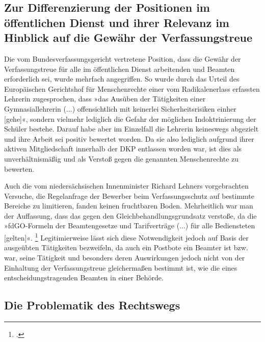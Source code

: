 \documentclass[12pt]{scrartcl}
\begin{document}
\subsection{Zur Differenzierung der Positionen im öffentlichen Dienst und ihrer Relevanz im Hinblick auf die Gewähr der Verfassungstreue}

Die vom Bundesverfassungsgericht vertretene Position, dass die Gewähr der Verfassungstreue für alle im öffentlichen Dienst arbeitenden und Beamten erforderlich sei, wurde mehrfach angegriffen. So wurde durch das Urteil des Europäischen Gerichtshof für Menschenrechte einer vom Radikalenerlass erfassten Lehrerin zugesprochen, dass »das Ausüben der Tätigkeiten einer Gymnasiallehrerin (...) offensichtlich mit keinerlei Sicherheitsrisiken einher [gehe]«, sondern vielmehr lediglich die Gefahr der möglichen Indoktrinierung der Schüler bestehe. Darauf habe aber im Einzelfall die Lehrerin keineswegs abgezielt und ihre Arbeit sei positiv bewertet worden. Da sie also lediglich aufgrund ihrer aktiven Mitgliedschaft innerhalb der DKP entlassen worden war, ist dies als unverhältnismäßig und als Verstoß gegen die genannten Menschenrechte zu bewerten.

Auch die vom niedersächsischen Innenminister Richard Lehners vorgebrachten Versuche, die Regelanfrage der Bewerber beim Verfassungsschutz auf bestimmte Bereiche zu limitieren, fanden keinen fruchtbaren Boden. Mehrheitlich war man der Auffassung, dass das gegen den Gleichbehandlungsgrundsatz verstoße, da die »fdGO-Formeln der Beamtengesetze und Tarifverträge (...) für alle Bediensteten [gelten]«. \footcite[][S. 344]{rigoll_staatsschutz_2013} Legitimierweise lässt sich diese Notwendigkeit jedoch auf Basis der ausgeübten Tätigkeiten bezweifeln, da auch ein Postbote ein Beamter ist bzw. war, seine Tätigkeit und besonders deren Auswirkungen jedoch nicht von der Einhaltung der Verfassungstreue gleichermaßen bestimmt ist, wie die eines entscheidungstragenden Beamten in einer Behörde.

\subsection{Die Problematik des Rechtswegs}
\end{document}
